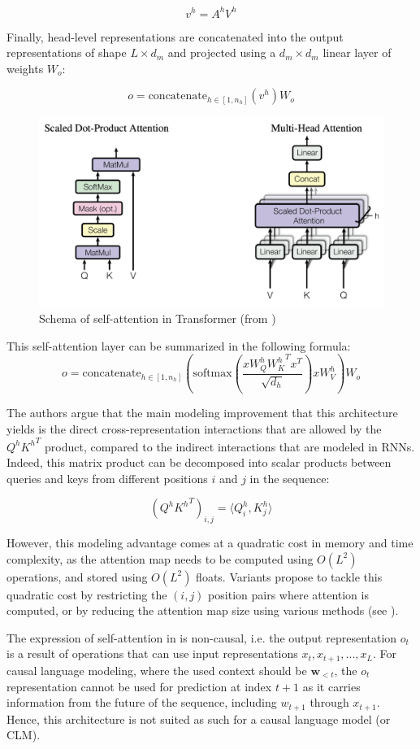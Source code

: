 $$
v^h = A^h V^h
$$

Finally, head-level representations are concatenated into the output representations of shape $L \times d_m$ and projected using a $d_m \times d_m$ linear layer of weights $W_o$:

$$
o = \text{concatenate}_{h\in [1, n_h]}(v^h) W_o
$$

\begin{figure}
    \centering
    \includegraphics[width=0.6\linewidth]{sources/related_works/imgs/transformer_attn_schema.png}
    \caption{Schema of self-attention in Transformer (from \citet{vaswani2017attention})}
    \label{fig:self_attn}
\end{figure}

This self-attention layer can be summarized in the following formula:
\begin{equation}
    \label{eq:self_attn}
o = \text{concatenate}_{h\in [1, n_h]} \left( \text{softmax} \left(\frac{x W_Q^h {W_K^h}^T x^T}{\sqrt{d_h}}\right) x W_V^h \right) W_o
\end{equation}


The authors argue that the main modeling improvement that this architecture yields is the direct cross-representation interactions that are allowed by the $Q^h {K^h}^T$ product, compared to the indirect interactions that are modeled in RNNs. Indeed, this matrix product can be decomposed into scalar products between queries and keys from different positions $i$ and $j$ in the sequence:

$$
(Q^h {K^h}^T)_{i, j} = \langle Q^h_i , K^h_j \rangle
$$

However, this modeling advantage comes at a quadratic cost in memory and time complexity, as the attention map needs to be computed using $O(L^2)$ operations, and stored using $O(L^2)$ floats. Variants propose to tackle this quadratic cost by restricting the $(i, j)$ position pairs where attention is computed, or by reducing the attention map size using various methods (see ).

The expression of self-attention in  is non-causal, i.e. the output representation $o_t$ is a result of operations that can use input representations $x_t, x_{t+1}, ..., x_L$. For causal language modeling, where the used context should be $\mathbf{w}_{< t}$, the $o_t$ representation cannot be used for prediction at index $t + 1$ as it carries information from the future of the sequence, including $w_{t+1}$ through $x_{t+1}$. Hence, this architecture is not suited as such for a causal language model (or CLM).

